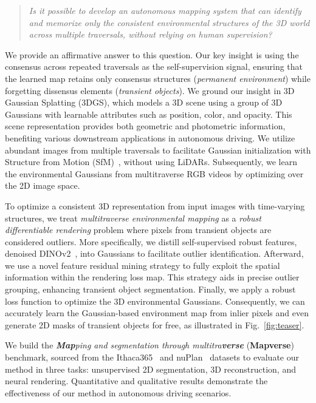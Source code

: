 \begin{quote}
\textit{Is it possible to develop an autonomous mapping system that can identify and memorize only the consistent environmental structures of the 3D world across multiple traversals, without relying on human supervision?}
\end{quote}

We provide an affirmative answer to this question. Our key insight is using the consensus across repeated traversals as the self-supervision signal, ensuring that the learned map retains only consensus structures (\textit{permanent environment}) while forgetting dissensus elements (\textit{transient objects}). We ground our insight in 3D Gaussian Splatting (3DGS)\cite{kerbl20233d}, which models a 3D scene using a group of 3D Gaussians with learnable attributes such as position, color, and opacity. This scene representation provides both geometric and photometric information, benefiting various downstream applications in autonomous driving. We utilize abundant images from multiple traversals to facilitate Gaussian initialization with Structure from Motion (SfM)~\cite{schonberger2016structure}, without using LiDARs. Subsequently, we learn the environmental Gaussians from multitraverse RGB videos by optimizing over the 2D image space.

To optimize a consistent 3D representation from input images with time-varying structures, we treat \textit{multitraverse environmental mapping} as a \textit{robust differentiable rendering} problem where pixels from transient objects are considered outliers. More specifically, we distill self-supervised robust features, denoised DINOv2~\cite{yang2024denoising,oquab2023dinov2}, into Gaussians to facilitate outlier identification. Afterward, we use a novel feature residual mining strategy to fully exploit the spatial information within the rendering loss map. This strategy aids in precise outlier grouping, enhancing transient object segmentation. Finally, we apply a robust loss function to optimize the 3D environmental Gaussians. Consequently, we can accurately learn the Gaussian-based environment map from inlier pixels and even generate 2D masks of transient objects for free, as illustrated in Fig.~\ref{fig:teaser}.

We build the \textit{\textbf{Map}ping and segmentation through multitra\textbf{verse}} (\textbf{Mapverse}) benchmark, sourced from the Ithaca365~\cite{diaz2022ithaca365} and nuPlan~\cite{karnchanachari2024towards} datasets to evaluate our method in three tasks: unsupervised 2D segmentation, 3D reconstruction, and neural rendering. Quantitative and qualitative results demonstrate the effectiveness of our method in autonomous driving scenarios. 

